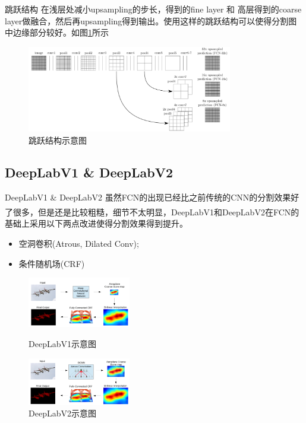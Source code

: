 \documentclass{beamer}
\newcommand{\upcite}[1]{\textsuperscript{\textsuperscript{\cite{#1}}}}
\begin{document}
\begin{frame}{跳跃结构}
\qquad 在浅层处减小upsampling的步长，得到的fine layer 和 高层得到的coarse layer做融合，然后再upsampling得到输出。使用这样的跳跃结构可以使得分割图中边缘部分较好。如图\ref{skip}所示

\begin{figure}[h]
	\centering
	\includegraphics[width=0.8\textwidth]{images/skip.png}
	\caption{\label{skip}跳跃结构示意图}
\end{figure}
\end{frame}

\subsection{DeepLabV1 \& DeepLabV2}
\begin{frame}{DeepLabV1 \& DeepLabV2}
虽然FCN的出现已经比之前传统的CNN的分割效果好了很多，但是还是比较粗糙，细节不太明显，DeepLabV1\upcite{chen2014semantic}和DeepLabV2\upcite{chen2018deeplab}在FCN的基础上采用以下两点改进使得分割效果得到提升。
\begin{itemize}
	\item 空洞卷积(Atrous, Dilated Conv);
	\item 条件随机场(CRF)
\end{itemize}

\begin{figure}[h]
	\centering
	\begin{minipage}[t]{0.4\textwidth}
		\centering
		\includegraphics[width=4.5cm]{images/deeplabv1.png}
		\caption{\label{deeplabv1}DeepLabV1示意图}
	\end{minipage}
	\begin{minipage}[t]{0.4\textwidth}
		\centering
		\includegraphics[width=4.5cm]{images/deeplabv2.png}
		\caption{\label{deeplabv2}DeepLabV2示意图}
	\end{minipage}
\end{figure}
\end{frame}
\end{document}
